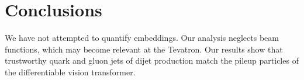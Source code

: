 \section{Conclusions}\label{sec:conclusions}

We have not attempted to quantify embeddings. Our analysis neglects beam
functions, which may become relevant at the Tevatron. Our results show
that trustworthy quark and gluon jets of dijet production match the
pileup particles of the differentiable vision transformer.

